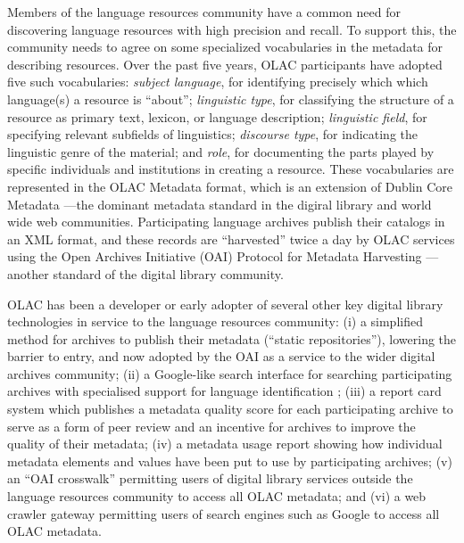 Members of the language resources community have a common need for
discovering language resources with high precision and recall.  To
support this, the community needs to agree on
some specialized vocabularies in the metadata for
describing resources.  Over the past five years, OLAC
participants have adopted five such vocabularies:
\textit{subject language},
  for identifying precisely which which language(s) a resource is ``about'';
\textit{linguistic type},
  for classifying the structure of a resource as primary text,
  lexicon, or language description;
\textit{linguistic field},
  for specifying relevant subfields of linguistics;
\textit{discourse type},
  for indicating the linguistic genre of the material;
  and
\textit{role},
  for documenting the parts played by specific individuals and institutions
  in creating a resource.
These vocabularies are represented in the OLAC Metadata format,
which is an extension of Dublin Core Metadata \citep{BirdSimons04metadata}---the dominant metadata standard in the
digiral library and world wide web communities.
Participating language archives publish their catalogs in an XML
format, and these records are ``harvested'' twice a day by OLAC services
using the Open Archives Initiative (OAI) Protocol for Metadata Harvesting
\citep{SimonsBird03lht}---another standard of the digital library community.


OLAC has been a developer or early adopter of several other key
digital library technologies in service to the language resources
community:
(i) a simplified method for archives to publish their metadata
  (``static repositories''), lowering the barrier to entry, and
  now adopted by the OAI as a service to the wider
  digital archives community;
(ii) a Google-like search interface for searching participating
  archives with specialised support for language identification
  \citep{HughesKamat05,Hughes06lrec};
(iii) a report card system which publishes a metadata quality score
  for each participating archive to serve as a form of
  peer review and an incentive for archives to improve the quality of
  their metadata;
(iv) a metadata usage report showing how individual metadata
  elements and values have been put to use by participating archives;
(v) an ``OAI crosswalk'' permitting users of digital library services
  outside the language resources community to access all OLAC metadata;
  and
(vi) a web crawler gateway permitting users of search engines such
  as Google to access all OLAC metadata.

